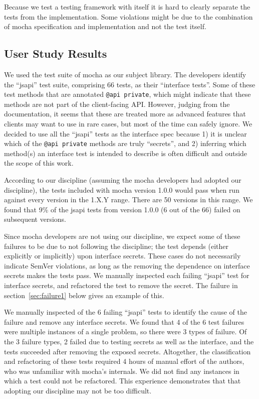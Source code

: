 Because we test a testing framework with itself it is hard to clearly
separate the tests from the implementation. Some violations might be 
due to the combination of mocha specification and implementation and not
the test itself.

\subsection{User Study Results}
We used the test suite of mocha as our subject library. The developers
identify the ``jsapi'' test suite, comprising 66 tests, as their
``interface tests''. Some of these test methods that are annotated
{\tt @api private}, which might indicate that these methods are not
part of the client-facing API\@. However, judging from the
documentation, it seems that these are treated more as advanced
features that clients may want to use in rare cases, but most of the
time can safely ignore. We decided to use all the ``jsapi'' tests as the
interface spec because 1) it is unclear which of the {\tt @api
  private} methods are truly ``secrets'', and 2) inferring which
method(s) an interface test is intended to describe is often difficult and
outside the scope of this work.

According to our discipline (assuming the mocha developers had adopted
our discipline), the tests included with mocha version 1.0.0 would
pass when run against every version in the 1.X.Y range. There are 50
versions in this range. We found that 9\% of the jsapi tests from
version 1.0.0 (6 out of the 66) failed on subsequent versions.

Since mocha developers are not using our discipline, we expect some of
these failures to be due to not following the discipline; the test
depends (either explicitly or implicitly) upon interface secrets. These
cases do not necessarily indicate SemVer violations, as long as the
removing the dependence on interface secrets makes the tests pass. We
manually inspected each failing ``jsapi'' test for interface secrets, and
refactored the test to remove the secret. The failure in
section~\ref{sec:failure1} below gives an example of this.

We manually inspected of the 6 failing ``jsapi'' tests to identify the
cause of the failure and remove any interface secrets. We found that 4 of
the 6 test failures were multiple instances of a single problem, so
there were 3 types of failure. Of the 3 failure types, 2 failed due to
testing secrets as well as the interface, and the tests succeeded after
removing the exposed secrets. Altogether, the classification and
refactoring of these tests required 4 hours of manual effort of the
authors, who was unfamiliar with mocha's internals. We did not find any
instances in which a test could not be refactored. This experience
demonstrates that that adopting our discipline may not be too difficult.


